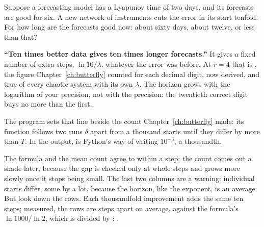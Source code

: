
\begin{think}
Suppose a forecasting model has a Lyapunov time of two days, and its
forecasts are good for six. A new network of instruments cuts the error in
its start tenfold. For how long are the forecasts good now: about sixty days,
about twelve, or less than that?
\end{think}

\begin{trapbox}
\textbf{\enquote{Ten times better data gives ten times longer forecasts.}}
It gives a fixed number of extra steps, $\ln 10/\lambda$, whatever the error
was before. At $r = 4$ that is , the figure
Chapter~\ref{ch:butterfly} counted for each decimal digit, now derived, and
true of every chaotic system with its own $\lambda$. The horizon grows with
the logarithm of your precision, not with the precision: the twentieth
correct digit buys no more than the first.
\end{trapbox}


\noindent
The program sets that line beside the count Chapter~\ref{ch:butterfly}
made: its function  follows two runs $\delta$ apart from a
thousand starts until they differ by more than $T$. In the output,
 is Python's way of writing $10^{-3}$, a thousandth.



\noindent
The formula and the mean count agree to within a step; the count comes out
a shade later, because the gap is checked only at whole steps and grows more
slowly once it stops being small. The last two columns are a warning:
individual starts differ, some by a lot, because the horizon, like the
exponent, is an average. But look down the rows. Each thousandfold
improvement adds the same ten steps; measured, the rows are
 steps apart on average, against the formula's
$\ln 1000/\ln 2$, which is  divided by
: .

